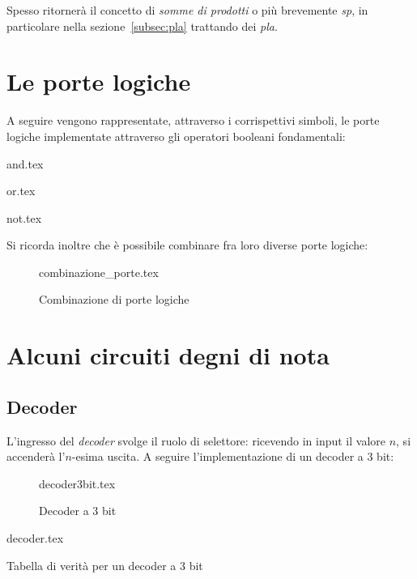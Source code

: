 \documentclass[class=book, crop=false]{standalone}
\begin{document}
Spesso ritornerà il concetto di \emph{somme di prodotti} o più brevemente \emph{sp}, in particolare nella sezione~\ref{subsec:pla} trattando dei \emph{pla}.

\section{Le porte logiche}
A seguire vengono rappresentate, attraverso i corrispettivi simboli, le porte logiche implementate attraverso gli operatori booleani fondamentali:
\vspace{10px}

\begin{minipage}[c]{.3\textwidth}
	\centering
	{and.tex}
\end{minipage}
\begin{minipage}[c]{.3\textwidth}
	\centering
	{or.tex}
\end{minipage}
\begin{minipage}[c]{.3\textwidth}
	\centering
	{not.tex}
\end{minipage}

\vspace{10px}

Si ricorda inoltre che è possibile combinare fra loro diverse porte logiche:
\begin{figure}[H]
	\centering
	{combinazione_porte.tex}
	\caption{Combinazione di porte logiche}
\end{figure}

\section{Alcuni circuiti degni di nota}
\subsection*{Decoder}
L'ingresso del \emph{decoder} svolge il ruolo di selettore: ricevendo in input il valore \(n\), si accenderà l'\(n\)-esima uscita. A seguire l'implementazione di un decoder a 3 bit:
\begin{figure}[H]
	\centering
	{decoder3bit.tex}
	\caption{Decoder a 3 bit}
\end{figure}
\begin{table}[!h]
	\centering
	{decoder.tex}
	\caption{Tabella di verità per un decoder a 3 bit}
	\label{decoder-3bit}
\end{table}
\end{document}
